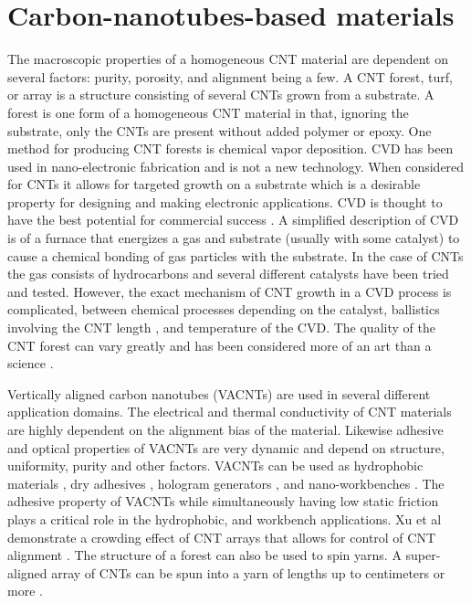 \section{Carbon-nanotubes-based materials}
	
	The macroscopic properties of a homogeneous CNT material are dependent on several factors: purity, porosity, and alignment being a few. A CNT forest, turf, or array is a structure consisting of several CNTs grown from a substrate. A forest is one form of a homogeneous CNT material in that, ignoring the substrate, only the CNTs are present without added polymer or epoxy. One method for producing CNT forests is chemical vapor deposition. CVD has been used in nano-electronic fabrication and is not a new technology. When considered for CNTs it allows for targeted growth on a substrate which is a desirable property for designing and making electronic applications. CVD is thought to have the best potential for commercial success \cite{Nessim2010}. A simplified description of CVD is of a furnace that energizes a gas and substrate (usually with some catalyst) to cause a chemical bonding of gas particles with the substrate. In the case of CNTs the gas consists of hydrocarbons and several different catalysts have been tried and tested. However, the exact mechanism of CNT growth in a CVD process is complicated, between chemical processes depending on the catalyst, ballistics involving the CNT length \cite{Louchev2003}, and temperature of the CVD. The quality of the CNT forest can vary greatly and has been considered more of an art than a science \cite{Nessim2010}.  
	
	Vertically aligned carbon nanotubes (VACNTs) are used in several different application domains. The electrical and thermal conductivity of CNT materials are highly dependent on the alignment bias of the material. Likewise adhesive and optical properties of VACNTs are very dynamic and depend on structure, uniformity, purity and other factors. VACNTs can be used as hydrophobic materials \cite{Lau2003}, dry adhesives \cite{Chen2012}, hologram generators \cite{Montelongo2013}, and nano-workbenches \cite{Gjerde2006}. The adhesive property of VACNTs while simultaneously having low static friction plays a critical role in the hydrophobic, and workbench applications. Xu et al demonstrate a crowding effect of CNT arrays that allows for control of CNT alignment \cite{Xu2012}. The structure of a forest can also be used to spin yarns. A super-aligned array of CNTs can be spun into a yarn of lengths up to centimeters or more \cite{Jiang2002}.
	
